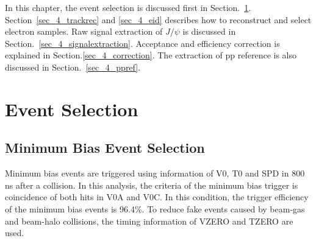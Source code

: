 In this chapter, the event selection is discussed first in Section.~\ref{sec_4_eventselection}.
Section~\ref{sec_4_trackrec} and \ref{sec_4_eid} describes how to reconstruct and select electron samples.  
Raw signal extraction of $J/\psi$ is discussed in Section.~\ref{sec_4_signalextraction}. 
Acceptance and efficiency correction is explained in Section.\ref{sec_4_correction}. 
The extraction of pp reference is also discussed in Section.~\ref{sec_4_ppref}.

\section{Event Selection}
\label{sec_4_eventselection}
\subsection{Minimum Bias Event Selection}
Minimum bias events are triggered using information of V0, T0 and SPD in 800 ns after a collision. 
In this analysis, the criteria of the minimum bias trigger is coincidence of both hits in V0A and V0C.
In this condition, the trigger efficiency of the minimum bias events is 96.4\%. 
To reduce fake events caused by beam-gas and beam-halo collisions, the timing information of VZERO and TZERO are used. 

